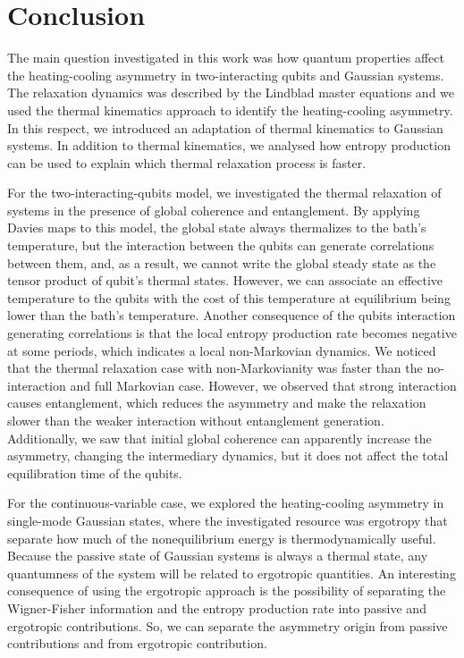 

\chapter{Conclusion}\label{cap:conclusion}

The main question investigated in this work was how quantum properties affect the heating-cooling asymmetry in two-interacting qubits and Gaussian systems. The relaxation dynamics was described by the Lindblad master equations and we used the thermal kinematics approach to identify the heating-cooling asymmetry. In this respect, we introduced an adaptation of thermal kinematics to Gaussian systems. In addition to thermal kinematics, we analysed how entropy production can be used to explain which thermal relaxation process is faster.

For the two-interacting-qubits model, we investigated the thermal relaxation of systems in the presence of global coherence and entanglement. By applying Davies maps to this model, the global state always thermalizes to the bath's temperature, but the interaction between the qubits can generate correlations between them, and, as a result, we cannot write the global steady state as the tensor product of qubit's thermal states. However, we can associate an effective temperature to the qubits with the cost of this temperature at equilibrium being lower than the bath's temperature. Another consequence of the qubits interaction generating correlations is that the local entropy production rate becomes negative at some periods, which indicates a local non-Markovian dynamics. We noticed that the thermal relaxation case with non-Markovianity was faster than the no-interaction and full Markovian case. However, we observed that strong interaction causes entanglement, which reduces the asymmetry and make the relaxation slower than the weaker interaction without entanglement generation. Additionally, we saw that initial global coherence can apparently increase the asymmetry, changing the intermediary dynamics, but it does not affect the total equilibration time of the qubits.

For the continuous-variable case, we explored the heating-cooling asymmetry in single-mode Gaussian states, where the investigated resource was ergotropy that separate how much of the nonequilibrium energy is thermodynamically useful. Because the passive state of Gaussian systems is always a thermal state, any quantumness of the system will be related to ergotropic quantities. An interesting consequence of using the ergotropic approach is the possibility of separating the Wigner-Fisher information and the entropy production rate into passive and ergotropic contributions. So, we can separate the asymmetry origin from passive contributions and from ergotropic contribution.


